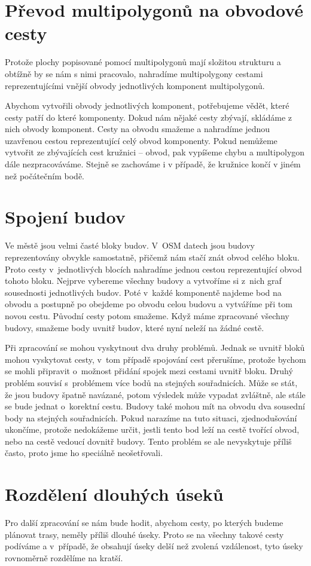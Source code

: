 \section{Převod multipolygonů na obvodové cesty}
Protože plochy popisované pomocí multipolygonů mají složitou strukturu a obtížně
by se nám s nimi pracovalo, nahradíme multipolygony cestami reprezentujícími
vnější obvody jednotlivých komponent multipolygonů.

Abychom vytvořili obvody jednotlivých komponent, potřebujeme vědět, které cesty
patří do které komponenty.  Dokud nám nějaké cesty zbývají, skládáme z nich
obvody komponent. Cesty na obvodu smažeme a nahradíme jednou uzavřenou cestou
reprezentující celý obvod komponenty. Pokud nemůžeme vytvořit ze zbývajících
cest kružnici -- obvod, pak vypíšeme chybu a multipolygon dále nezpracováváme.
Stejně se zachováme i v případě, že kružnice končí v jiném než počátečním bodě.

\section{Spojení budov}
Ve městě jsou velmi časté bloky budov. V~OSM datech jsou budovy reprezentovány
obvykle samostatně, přičemž nám stačí znát obvod celého bloku. Proto cesty
v~jednotlivých blocích nahradíme jednou cestou reprezentující obvod tohoto bloku.
Nejprve vybereme všechny budovy a vytvoříme si z~nich graf sousednosti
jednotlivých budov. Poté v~každé komponentě najdeme bod na obvodu a postupně
po obejdeme po obvodu celou budovu a vytváříme při tom novou cestu. Původní
cesty potom smažeme. Když máme zpracované všechny budovy, smažeme body uvnitř
budov, které nyní neleží na žádné cestě.

Při zpracování se mohou vyskytnout dva druhy problémů. Jednak se uvnitř bloků
mohou vyskytovat cesty, v~tom případě spojování cest přerušíme, protože bychom
se mohli připravit o~možnost přidání spojek mezi cestami uvnitř bloku. Druhý
problém souvisí s~problémem více bodů na stejných souřadnicích. Může se stát, že
jsou budovy špatně navázané, potom výsledek může vypadat zvláštně, ale stále se
bude jednat o~korektní cestu. Budovy také mohou mít na obvodu dva sousední body
na stejných souřadnicích. Pokud narazíme na tuto situaci, zjednodušování
ukončíme, protože nedokážeme určit, jestli tento bod leží na cestě tvořící
obvod, nebo na cestě vedoucí dovnitř budovy. Tento problém se ale nevyskytuje
příliš často, proto jsme ho speciálně neošetřovali.

\section{Rozdělení dlouhých úseků}
Pro další zpracování se nám bude hodit, abychom cesty, po kterých budeme
plánovat trasy, neměly příliš dlouhé úseky. Proto se na všechny takové cesty
podíváme a v~případě, že obsahují úseky delší než zvolená vzdálenost, tyto úseky
rovnoměrně rozdělíme na kratší. 

